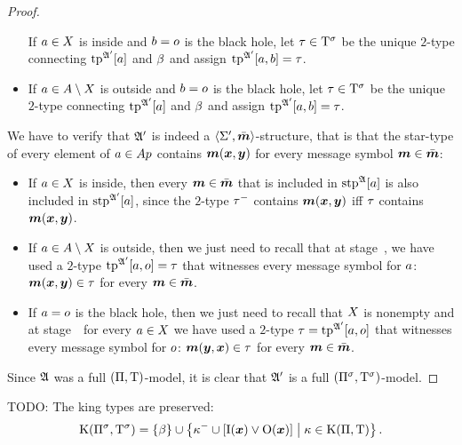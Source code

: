 \begin{proof}
\begin{itemize}
  If $a \in X$ is inside and $b = o$ is the black hole, let $\tau
  \in \mathrm{T}^{\sigma}$ be the unique $2$-type connecting $\operatorname{tp}^{\mathfrak{A'}}[a]$ and
  $\beta$ and assign $\operatorname{tp}^{\mathfrak{A'}}[a,b] = \tau$.
  \item[\refsticondOB]
  If $a \in A\setminus X$ is outside and $b = o$ is the black hole, let
  $\tau \in \mathrm{T}^{\sigma}$ be the unique $2$-type connecting $\operatorname{tp}^{\mathfrak{A'}}[a]$ and
  $\beta$ and assign $\operatorname{tp}^{\mathfrak{A'}}[a,b] = \tau$.
\end{itemize}
We have to verify that $\mathfrak{A'}$ is indeed a $\left\langle \mathrm{\Sigma'},\bar{\bm{m}} \right\rangle$-structure, that
is that the star-type of every element of $a \in Ap$ contains
$\bm{m}(\bm{x},\bm{y})$ for every message symbol $\bm{m} \in \bar{\bm{m}}$:
\begin{itemize}
\item[\refsticondI] If $a \in X$ is inside, then every
$\bm{m} \in \bar{\bm{m}}$ that is included in $\operatorname{stp}^{\mathfrak{A}}[a]$ is also included in
$\operatorname{stp}^{\mathfrak{A'}}[a]$, since the $2$-type $\tau^{-}$ contains $\bm{m}(\bm{x},\bm{y})$ iff
$\tau$ contains $\bm{m}(\bm{x},\bm{y})$.
\item[\refsticondO] If $a \in A\setminus X$ is outside, then we just need to
recall that at stage~, we have used a $2$-type $\operatorname{tp}^{\mathfrak{A'}}[a,o]
= \tau$ that witnesses every message symbol for $a$: $\bm{m}(\bm{x},\bm{y}) \in
\tau$ for every $\bm{m} \in \bar{\bm{m}}$.
\item[\refsticondB] If $a = o$ is the black hole, then we just need to
recall that $X$ is nonempty and at stage~~for every $a \in
X$ we have used a $2$-type $\tau = \operatorname{tp}^{\mathfrak{A'}}[a,o]$ that witnesses every
message symbol for $o$: $\bm{m}(\bm{y},\bm{x}) \in \tau$ for every $\bm{m} \in \bar{\bm{m}}$.
\end{itemize}
Since $\mathfrak{A}$ was a full $(\Pi,\mathrm{T})$-model, it is clear that $\mathfrak{A'}$ is a
full $(\Pi^{\sigma},\mathrm{T}^{\sigma})$-model.
\end{proof}

\begin{remark}%
TODO: The king types are preserved:
\[
  \mathrm{K}(\Pi^{\sigma},\mathrm{T}^{\sigma}) = \left\{\beta\right\} \cup
  \left\{\kappa^{-}\cup[\mathrm{I}(\bm{x})\lor\mathrm{O}(\bm{x})]\mathrel{}\middle|\mathrel{}\kappa\in\mathrm{K}(\Pi,\mathrm{T})\right\}.
\]
\end{remark}

